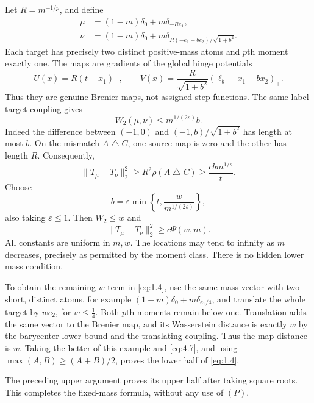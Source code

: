 Let $R=m^{-1/p}$, and define
\begin{equation}
  \begin{aligned}
  \mu&=(1-m)\delta_0+m\delta_{-Re_1},\\
  \nu&=(1-m)\delta_0+m\delta_{R(-e_1+be_2)/\sqrt{1+b^2}}.
  \end{aligned}
  \tag{4.3}\label{eq:4.3}
\end{equation}
Each target has precisely two distinct positive-mass atoms and $p$th moment exactly one. The maps are gradients of the global hinge potentials
\begin{equation}
  U(x)=R(t-x_1)_+,
  \qquad V(x)=\frac{R}{\sqrt{1+b^2}}(\ell_b-x_1+bx_2)_+.
  \tag{4.4}\label{eq:4.4}
\end{equation}
Thus they are genuine Brenier maps, not assigned step functions. The same-label target coupling gives
\begin{equation}
  W_2(\mu,\nu)\le m^{1/(2s)}b.
  \tag{4.5}\label{eq:4.5}
\end{equation}
Indeed the difference between $(-1,0)$ and $(-1,b)/\sqrt{1+b^2}$ has length at most $b$. On the mismatch $A\mathbin{\triangle}C$, one source map is zero and the other has length $R$. Consequently,
\begin{equation}
  \|T_\mu-T_\nu\|_2^2
    \ge R^2\rho(A\mathbin{\triangle}C)
    \ge\frac{cbm^{1/s}}{t}.
  \tag{4.6}\label{eq:4.6}
\end{equation}
Choose
\[
  b=\varepsilon\min\!\left\{t,\frac{w}{m^{1/(2s)}}\right\},
\]
also taking $\varepsilon\le1$. Then $W_2\le w$ and
\begin{equation}
  \|T_\mu-T_\nu\|_2^2\ge c\Psi(w,m).
  \tag{4.7}\label{eq:4.7}
\end{equation}
All constants are uniform in $m,w$. The locations may tend to infinity as $m$ decreases, precisely as permitted by the moment class. There is no hidden lower mass condition.

To obtain the remaining $w$ term in \eqref{eq:1.4}, use the same mass vector with two short, distinct atoms, for example $(1-m)\delta_0+m\delta_{e_1/4}$, and translate the whole target by $we_2$, for $w\le\tfrac14$. Both $p$th moments remain below one. Translation adds the same vector to the Brenier map, and its Wasserstein distance is exactly $w$ by the barycenter lower bound and the translating coupling. Thus the map distance is $w$. Taking the better of this example and \eqref{eq:4.7}, and using $\max(A,B)\ge(A+B)/2$, proves the lower half of \eqref{eq:1.4}.

The preceding upper argument proves its upper half after taking square roots. This completes the fixed-mass formula, without any use of $(P)$.

